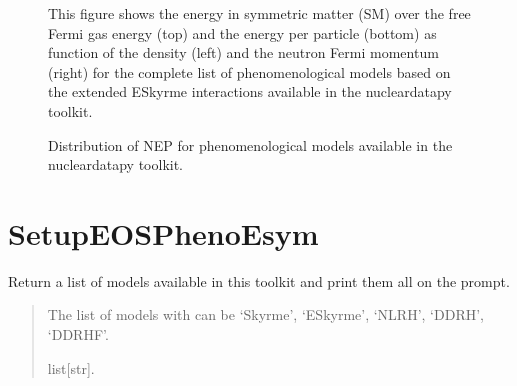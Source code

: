 \documentclass[letterpaper,10pt,english]{sphinxmanual}
\begin{document}
\begin{figure}[htbp]
\centering
\capstart

\noindent{}
\caption{This figure shows the energy in symmetric matter (SM) over the free Fermi gas energy (top) and the energy per particle (bottom) as function of the density (left) and the neutron Fermi momentum (right) for the complete list of phenomenological models based on the extended ESkyrme interactions available in the nucleardatapy toolkit.}\label{\detokenize{source/api/setup_eos_pheno:id10}}\end{figure}

\begin{figure}[htbp]
\centering
\capstart

\noindent{}
\caption{Distribution of NEP for phenomenological models available in the nucleardatapy toolkit.}\label{\detokenize{source/api/setup_eos_pheno:id11}}\end{figure}

\sphinxstepscope


\section{SetupEOSPhenoEsym}
\label{\detokenize{source/api/setup_eos_pheno_esym:setupeosphenoesym}}\label{\detokenize{source/api/setup_eos_pheno_esym::doc}}\label{\detokenize{source/api/setup_eos_pheno_esym:module-nucleardatapy.eos.setup_pheno_esym}}

\begin{fulllineitems}
\label{\detokenize{source/api/setup_eos_pheno_esym:nucleardatapy.eos.setup_pheno_esym.pheno_esym_models}}
\pysigstartsignatures
{}
\pysigstopsignatures
\sphinxAtStartPar
Return a list of models available in this toolkit and print them all on the prompt.
\begin{quote}\begin{description}
\sphinxAtStartPar
The list of models with can be ‘Skyrme’, ‘ESkyrme’, ‘NLRH’, ‘DDRH’, ‘DDRHF’.

\sphinxAtStartPar
list{[}str{]}.

\end{description}\end{quote}

\end{fulllineitems}
\end{document}

